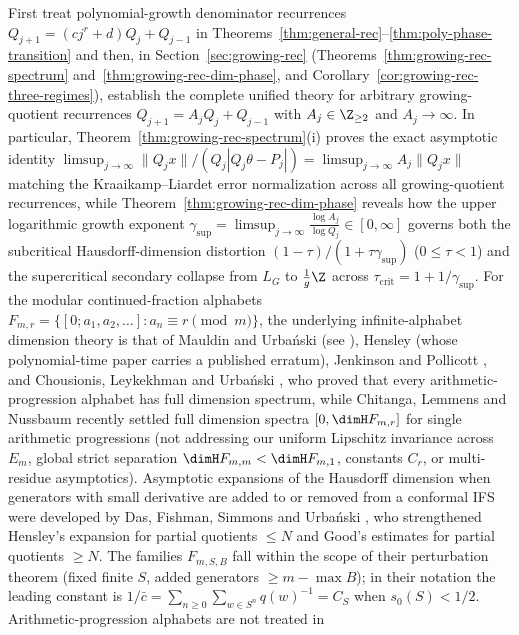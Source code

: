 First treat polynomial-growth denominator recurrences
$Q_{j+1}=(cj^r+d)Q_j+Q_{j-1}$ in
Theorems~\ref{thm:general-rec}--\ref{thm:poly-phase-transition} and then, in
Section~\ref{sec:growing-rec} (Theorems~\ref{thm:growing-rec-spectrum}
and~\ref{thm:growing-rec-dim-phase}, and
Corollary~\ref{cor:growing-rec-three-regimes}), establish the complete unified
theory for arbitrary growing-quotient recurrences $Q_{j+1}=A_jQ_j+Q_{j-1}$ with
$A_j\in\Z_{\ge2}$ and $A_j\to\infty$. In particular, Theorem~\ref{thm:growing-rec-spectrum}(i)
proves the exact asymptotic identity
$\limsup_{j\to\infty}\|Q_jx\|/(Q_j|Q_j\theta-P_j|)=\limsup_{j\to\infty}A_j\|Q_jx\|$
matching the Kraaikamp--Liardet error normalization across all growing-quotient
recurrences, while Theorem~\ref{thm:growing-rec-dim-phase} reveals how the upper
logarithmic growth exponent $\gamma_{\sup}=\limsup_{j\to\infty}\frac{\log A_j}{\log Q_j}\in[0,\infty]$
governs both the subcritical Hausdorff-dimension distortion
$(1-\tau)/(1+\tau\gamma_{\sup})$ ($0\le\tau<1$) and the supercritical secondary
collapse from $L_G$ to $\frac{1}{g}\Z$ across $\tau_{\mathrm{crit}}=1+1/\gamma_{\sup}$.
For the modular continued-fraction alphabets $F_{m,r}=\{[0;a_1,a_2,\dots]:a_n\equiv r\pmod m\}$,
the underlying infinite-alphabet dimension theory is that of Mauldin and
Urba\'nski \cite{MU96} (see \cite[Theorem~2.3]{CLU}), Hensley \cite{Hensley1996}
(whose polynomial-time paper carries a published erratum), Jenkinson and
Pollicott \cite{JP2018}, and Chousionis, Leykekhman and Urba\'nski \cite{CLU},
who proved that every arithmetic-progression alphabet has full dimension
spectrum, while Chitanga, Lemmens and Nussbaum \cite{CLN2026} recently settled
full dimension spectra $[0,\dimH F_{m,r}]$ for single arithmetic progressions
(not addressing our uniform Lipschitz invariance across $E_m$, global strict
separation $\dimH F_{m,m}<\dimH F_{m,1}$, constants $C_r$, or multi-residue
asymptotics). Asymptotic expansions of the Hausdorff dimension when generators
with small derivative are added to or removed from a conformal IFS were
developed by Das, Fishman, Simmons and Urba\'nski \cite{DFSU}, who
strengthened Hensley's expansion \cite{Hensley92} for partial quotients $\le N$
and Good's estimates \cite{Good41} for partial quotients $\ge N$. The families
$F_{m,S,B}$ fall within the scope of their perturbation theorem
\cite[Theorem~4.1]{DFSU} (fixed finite $S$, added generators $\ge m-\max B$);
in their notation the leading constant is $1/\bar c=\sum_{n\ge0}\sum_{w\in S^n}q(w)^{-1}=C_S$
when $s_0(S)<1/2$. Arithmetic-progression alphabets are not treated in

